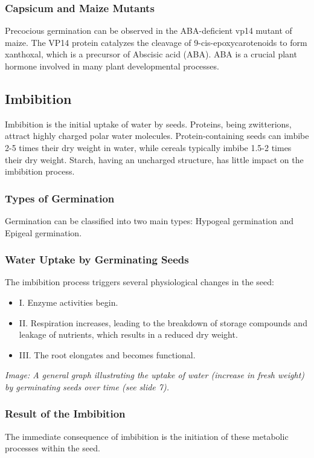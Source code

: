 \subsubsection{Capsicum and Maize Mutants} 
Precocious germination can be observed in the ABA-deficient vp14 mutant of maize. The VP14 protein catalyzes the cleavage of 9-cis-epoxycarotenoids to form xanthoxal, which is a precursor of Abscisic acid (ABA). ABA is a crucial plant hormone involved in many plant developmental processes.

\subsection{Imbibition} 
Imbibition is the initial uptake of water by seeds. Proteins, being zwitterions, attract highly charged polar water molecules. Protein-containing seeds can imbibe 2-5 times their dry weight in water, while cereals typically imbibe 1.5-2 times their dry weight. Starch, having an uncharged structure, has little impact on the imbibition process.

\subsubsection{Types of Germination} 
Germination can be classified into two main types: Hypogeal germination and Epigeal germination.

\subsubsection{Water Uptake by Germinating Seeds} 
The imbibition process triggers several physiological changes in the seed: 

\begin{itemize} 
    \item I. Enzyme activities begin. 
    \item II. Respiration increases, leading to the breakdown of storage compounds and leakage of nutrients, which results in a reduced dry weight. 
    \item III. The root elongates and becomes functional. 
\end{itemize} 

\textit{Image: A general graph illustrating the uptake of water (increase in fresh weight) by germinating seeds over time (see slide 7).}

\subsubsection{Result of the Imbibition} 
The immediate consequence of imbibition is the initiation of these metabolic processes within the seed.

